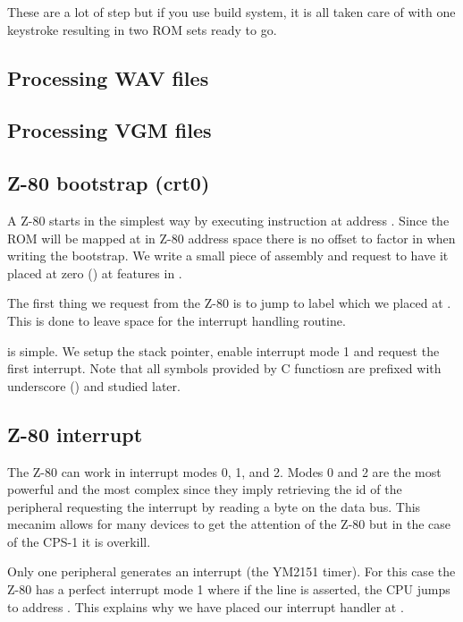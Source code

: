 \begin{trivia}
These are a lot of step but if you use  build system, it is all taken care of with one keystroke resulting in two ROM sets ready to go.
\end{trivia}

\subsection{Processing WAV files}

\subsection{Processing VGM files}

\subsection{Z-80 bootstrap (crt0)}

A Z-80 starts in the simplest way by executing instruction at address . Since the ROM will be mapped at  in Z-80 address space there is no offset to factor in when writing the bootstrap. We write a small piece of assembly and request to have it placed at zero () at features in .
\pagebreak



The first thing we request from the Z-80 is to jump to label  which we placed at . This is done to leave space for the interrupt handling routine.

 is simple. We setup the stack pointer, enable interrupt mode 1 and request the first interrupt. Note that all symbols provided by C functiosn are prefixed with underscore (\icode{\_}) and studied later.

\subsection{Z-80 interrupt}
The Z-80 can work in interrupt modes 0, 1, and 2. Modes 0 and 2 are the most powerful and the most complex since they imply retrieving the id of the peripheral requesting the interrupt by reading a byte on the data bus. This mecanim allows for many devices to get the attention of the Z-80 but in the case of the CPS-1 it is overkill. 

Only one peripheral generates an interrupt (the YM2151 timer). For this case the Z-80 has a perfect interrupt mode 1 where if the  line is asserted, the CPU jumps to address . This explains why we have placed our interrupt handler at .


